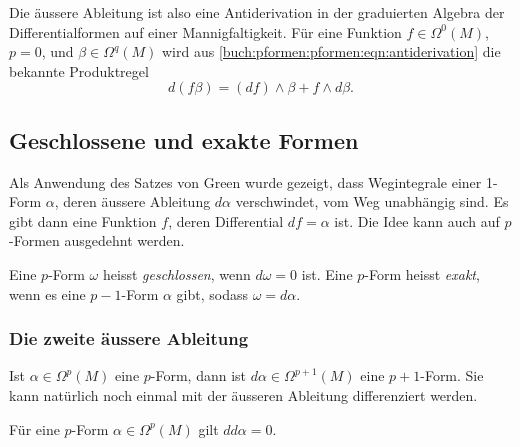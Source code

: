 Die äussere Ableitung ist also eine Antiderivation in der graduierten
Algebra der Differentialformen auf einer Mannigfaltigkeit.
Für eine Funktion $f\in\Omega^0(M)$, $p=0$, und $\beta\in\Omega^q(M)$ 
wird aus
\eqref{buch:pformen:pformen:eqn:antiderivation}
die bekannte Produktregel
\[
d(f\beta)
=
(df)\wedge \beta
+
f\wedge d\beta.
\]

%
%
\subsection{Geschlossene und exakte Formen}
Als Anwendung des Satzes von Green wurde gezeigt, dass Wegintegrale
einer 1-Form $\alpha$, deren äussere Ableitung $d\alpha$ verschwindet,
vom Weg unabhängig sind.
Es gibt dann eine Funktion $f$, deren Differential $df=\alpha$ ist.
Die Idee kann auch auf $p$-Formen ausgedehnt werden.

\begin{definition}
Eine $p$-Form $\omega$ heisst {\em geschlossen}, wenn $d\omega=0$ ist.
%
Eine $p$-Form heisst {\em exakt}, wenn es eine $p-1$-Form $\alpha$ gibt,
sodass $\omega = d\alpha$.
%
\end{definition}


%
%
\subsubsection{Die zweite äussere Ableitung}
Ist $\alpha\in\Omega^p(M)$ eine $p$-Form, dann ist $d\alpha\in\Omega^{p+1}(M)$
eine $p+1$-Form.
Sie kann natürlich noch einmal mit der äusseren Ableitung differenziert
werden.

\begin{satz}
\label{buch:section:pformen:satz:zweiteableitung}
Für eine $p$-Form $\alpha\in\Omega^{p}(M)$ gilt $dd\alpha=0$.
\end{satz}

